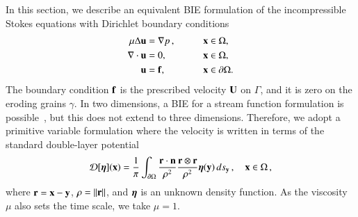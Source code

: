 \documentclass[preprint, 10pt]{elsarticle}
\begin{document}
In this section, we describe an equivalent BIE formulation of the
incompressible Stokes equations with Dirichlet boundary conditions
\begin{equation}
  \begin{split}
  \mu\Delta {\mathbf{u}} &= {\nabla} p\, , \qquad && {\mathbf{x}} \in \Omega, \\
  {\nabla} \cdot {\mathbf{u}} &= 0,   && {\mathbf{x}} \in \Omega, \\
  {\mathbf{u}} &= {\mathbf{f}},  && {\mathbf{x}} \in {\partial}\Omega.
  \end{split}
  \label{eqn:stokes}
\end{equation}
The boundary condition ${\mathbf{f}}$ is the prescribed velocity ${\mathbf{U}}$ on
$\Gamma$, and it is zero on the eroding grains $\gamma$.  In two
dimensions, a BIE for a stream function formulation is
possible~\cite{gre-kro-may1996}, but this does not extend to three
dimensions.  Therefore, we adopt a primitive variable formulation where
the velocity is written in terms of the standard double-layer
potential~\cite{lad1963,poz1992}
\begin{align}
  {\mathcal{D}}[{\boldsymbol\eta}]({\mathbf{x}}) = \frac{1}{\pi} \int_{{\partial}\Omega} 
    \frac{{\mathbf{r}} \cdot {\mathbf{n}}}{\rho^2} \frac{{\mathbf{r}} \otimes {\mathbf{r}}}{\rho^2} 
    {\boldsymbol\eta}({\mathbf{y}}) \, ds_{\mathbf{y}}\, , \quad {\mathbf{x}} \in \Omega \, ,
    \label{eqn:velocityDLP}
\end{align}
where ${\mathbf{r}} = {\mathbf{x}} - {\mathbf{y}}$, $\rho = \|{\mathbf{r}}\|$, and ${\boldsymbol\eta}$ is an unknown
density function.  As the viscosity $\mu$ also sets the time scale, we
take $\mu=1$.
\end{document}

